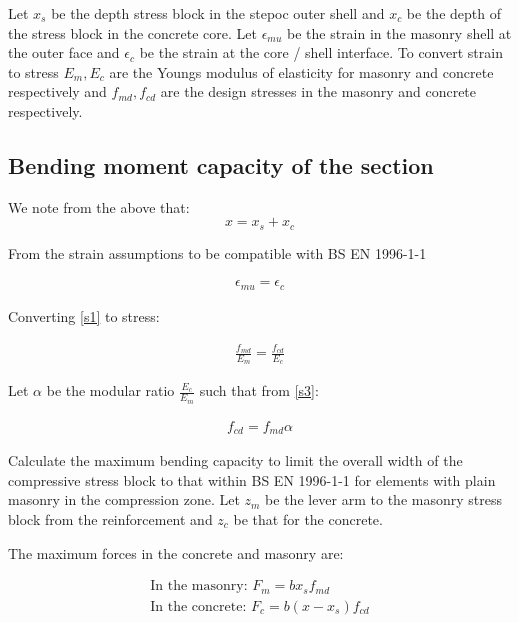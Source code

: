 \documentclass[11pt]{article}
\begin{document}
Let \(x_s\) be the depth stress block in the stepoc outer shell and
\(x_c\) be the depth of the stress block in the concrete core. Let
\(\epsilon_{mu}\) be the strain in the masonry shell at the outer face
and \(\epsilon_c\) be the strain at the core / shell interface. To
convert strain to stress \(E_m, E_c\) are the Youngs modulus of
elasticity for masonry and concrete respectively and \(f_{md}, f_{cd}\)
are the design stresses in the masonry and concrete respectively.

\hypertarget{bending-moment-capacity-of-the-section}{%
\subsection{Bending moment capacity of the
section}\label{bending-moment-capacity-of-the-section}}

We note from the above that: \begin{equation}
x = x_s + x_c
\end{equation}

From the strain assumptions to be compatible with BS EN 1996-1-1

\begin{align}
\epsilon_{mu} = \epsilon_c
\end{align}

Converting \ref{s1} to stress:

\begin{align}
\frac{f_{md}}{E_m} = \frac{f_{cd}}{E_c}
\end{align}

Let \(\alpha\) be the modular ratio \(\frac{E_c}{E_m}\) such that from
\ref{s3}:

\begin{align}
f_{cd} = f_{md} \alpha
\end{align}

    Calculate the maximum bending capacity to limit the overall width of the
compressive stress block to that within BS EN 1996-1-1 for elements with
plain masonry in the compression zone. Let \(z_m\) be the lever arm to
the masonry stress block from the reinforcement and \(z_c\) be that for
the concrete.

The maximum forces in the concrete and masonry are:

\begin{align}
\text{In the masonry: } 
F_m = b x_s f_{md}\\
\text{In the concrete: }
F_c = b (x - x_s)f_{cd}
\end{align}
\end{document}
